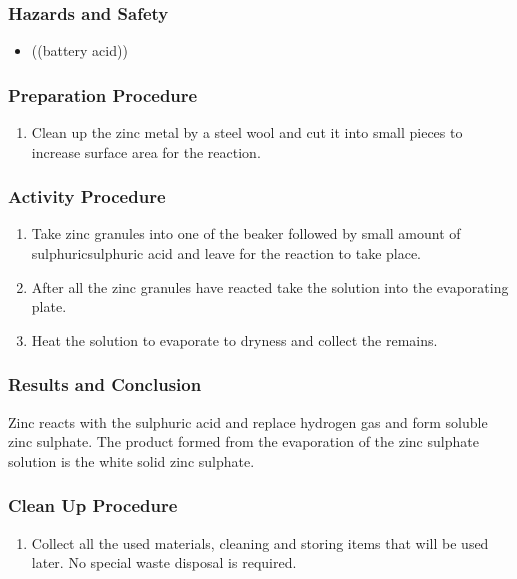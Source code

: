 \subsubsection*{Hazards and Safety}
\begin{itemize}
\item{((battery acid))}
\end{itemize}

\subsubsection*{Preparation Procedure}
\begin{enumerate}
\item{Clean up the zinc metal by a steel wool and cut it into small pieces to increase surface area for the reaction.}
\end{enumerate}

\subsubsection*{Activity Procedure}
\begin{enumerate}
\item{Take zinc granules into one of the beaker followed by small amount of sulphuricsulphuric acid and leave for the reaction to take place.}
\item{After all the zinc granules have reacted take the solution into the evaporating plate.}
\item{Heat the solution to evaporate to dryness and collect the remains.}
\end{enumerate}

\subsubsection*{Results and Conclusion}
Zinc reacts with the sulphuric acid and replace hydrogen gas and form soluble zinc sulphate. The product formed from the evaporation of the zinc sulphate solution is the white solid zinc sulphate.

\subsubsection*{Clean Up Procedure}
\begin{enumerate}
\item{Collect all the used materials, cleaning and storing items that will be used later. No special waste disposal is required.}
\end{enumerate}

